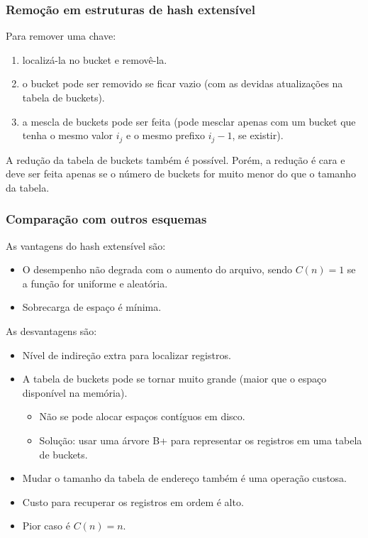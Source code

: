 \subsubsection{Remoção em estruturas de hash extensível}

Para remover uma chave:
\begin{enumerate}
\item localizá-la no bucket e removê-la.
\item o bucket pode ser removido se ficar vazio (com as devidas
atualizações na tabela de buckets).
\item a mescla de buckets pode ser feita (pode mesclar apenas com
um bucket que tenha o mesmo valor $i_j$ e o mesmo prefixo $i_j-1$, se existir).
\end{enumerate}
A redução da tabela de buckets também é possível. Porém, a redução é cara
e deve ser feita apenas se o número de buckets for muito menor do que o tamanho
da tabela.

\subsubsection{Comparação com outros esquemas}

As vantagens do hash extensível são:
\begin{itemize}
\item O desempenho não degrada com o aumento do arquivo, sendo $C(n)=1$ se a 
função for uniforme e aleatória.
\item Sobrecarga de espaço é mínima.
\end{itemize}

As desvantagens são:
\begin{itemize}
\item Nível de indireção extra para localizar registros.
\item A tabela de buckets pode se tornar muito grande (maior que o espaço
disponível na memória).
	\begin{itemize}
	\item Não se pode alocar espaços contíguos em disco.
	\item Solução: usar uma árvore B+ para representar os registros em 
		uma tabela de buckets.
	\end{itemize}
\item Mudar o tamanho da tabela de endereço também é uma operação custosa.
\item Custo para recuperar os registros em ordem é alto.
\item Pior caso é $C(n) = n$.
\end{itemize}

